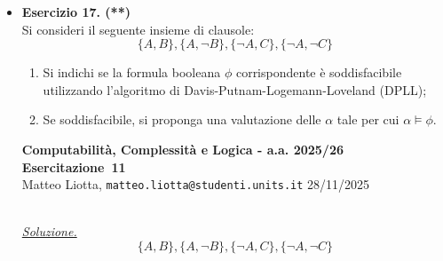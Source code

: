 \documentclass[a4paper,10pt]{article}
\makeatletter
\newcommand{\EsercitazioneNum}{11}
\newcommand{\Data}{28/11/2025}
\newcommand{\DocType}{Esercitazione} %
\newcommand{\FullTitle}{\DocType\ \EsercitazioneNum}
\newcommand{\Header}{
\noindent
  \small \textbf{Computabilità, Complessità e Logica - a.a. 2025/26} \hfill \textbf{\FullTitle} \\[0.2cm]
  \scriptsize Matteo Liotta, \texttt{matteo.liotta@studenti.units.it} \hfill \Data \\[0.2cm]
  \noindent\makebox[\linewidth]{\rule{\linewidth}{0.4pt}} \\[0.3cm]}
\newcommand{\NewPageHeader}{
  \vfill
  \noindent\makebox[\linewidth]{\rule{\linewidth}{0.4pt}}
  \newpage
  {\Header}
}
\makeatother
\begin{document}
{\begin{itemize}[label=, leftmargin=0pt]
\begin{osservazioni}
    \begin{itemize}[label=*]
        \item Sia $\alpha(A)=True$. Allora 
        $$\{C, D\}, \{\lnot B, C, \lnot D\}, \{\lnot C, D, E\}, \{\lnot D, \lnot E, B\}, \{\lnot B, E\}$$
        \begin{itemize}[label=*]
            \item Sia $\alpha(B)=True$. Allora:
            $$\{C, D\}, \{C, \lnot D\}, \{\lnot C, D, E\}, \{E\}$$
            \begin{itemize}[label=*]
                \item Sia $\alpha(C)=True$. Allora:
                $$\{D,E\}, \{E\}$$            
                    $\quad$ * Sia $\alpha(D)=True$. Allora:
                    $$\{E\}$$
            \end{itemize}
        \end{itemize}
    \end{itemize}
    
    Da cui, con $\alpha(E)=True$ segue la soddisfacibilità, poiché esiste almeno un modello che soddisfi la formula booleana corrispondente. Infatti, con 

   $$\alpha := \{A\rightarrow True,\ B\rightarrow True,\ C\rightarrow True,\ D\rightarrow True, \ E\rightarrow True\} $$

   $$\alpha \models\phi$$
    
    \end{osservazioni}

    \item \textbf{Esercizio 17. (**)}\\ 	
    Si consideri il seguente insieme di clausole:
    $$\{A, B\}, \{A, \neg B\}, \{\neg A, C\}, \{\neg A, \neg C\}$$
    \begin{enumerate}
        \item Si indichi se la formula booleana $\phi$ corrispondente è soddisfacibile utilizzando l'algoritmo di Davis-Putnam-Logemann-Loveland (DPLL);
        \item Se soddisfacibile, si proponga una valutazione delle  $\alpha$ tale per cui $\alpha\models\phi$.\\[0.2cm]
    \end{enumerate}

    \NewPageHeader

    \begin{osservazioni}
    \underline{\textit{Soluzione.}}\\
    $$\{A, B\}, \{A, \neg B\}, \{\neg A, C\}, \{\neg A, \neg C\}$$\\
    

\end{osservazioni}
\end{itemize}}
\end{document}
